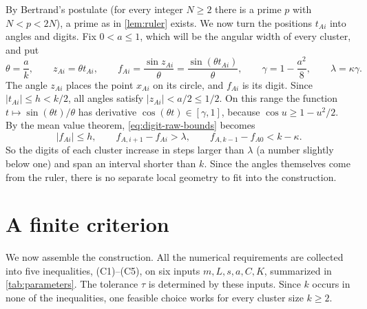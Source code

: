 \documentclass[11pt]{amsart}
\numberwithin{equation}{section}
\theoremstyle{definition}
\theoremstyle{remark}
\newcommand{\cond}[1]{\textup{(C#1)}}
\begin{document}
By Bertrand's postulate (for every integer $N\ge2$ there is a prime $p$
with $N<p<2N$), a prime as in \cref{lem:ruler} exists. We now turn the
positions $t_{Ai}$ into angles and digits. Fix $0<a\le1$, which will be
the angular width of every cluster, and put
\begin{equation}\label{eq:sine-digits}
 \theta=\frac ak,\qquad
 z_{Ai}=\theta t_{Ai},\qquad
 f_{Ai}=\frac{\sin z_{Ai}}{\theta}=\frac{\sin(\theta t_{Ai})}{\theta},\qquad
 \gamma=1-\frac{a^2}{8},\qquad \lambda=\kappa\gamma.
\end{equation}
The angle $z_{Ai}$ places the point $x_{Ai}$ on its circle, and $f_{Ai}$ is
its digit. Since $|t_{Ai}|\le h<k/2$, all angles satisfy
$|z_{Ai}|<a/2\le1/2$. On this range the function $t\mapsto\sin(\theta
t)/\theta$ has derivative $\cos(\theta t)\in[\gamma,1]$, because $\cos
u\ge1-u^2/2$. By the mean value theorem, \eqref{eq:digit-raw-bounds}
becomes
\begin{equation}\label{eq:digit-bounds}
 |f_{Ai}|\le h,\qquad
 f_{A,i+1}-f_{Ai}>\lambda,\qquad
 f_{A,k-1}-f_{A0}<k-\kappa.
\end{equation}
So the digits of each cluster increase in steps larger than $\lambda$ (a
number slightly below one) and span an interval shorter than $k$. Since
the angles themselves come from the ruler, there is no separate local
geometry to fit into the construction.

\section{A finite criterion}\label{sec:criterion}

We now assemble the construction. All the numerical requirements are
collected into five inequalities, \cond1--\cond5, on six inputs
$m,L,s,a,C,K$, summarized in \cref{tab:parameters}. The tolerance
$\tau$ is determined by these inputs. Since $k$ occurs in none of the
inequalities, one feasible choice works for every cluster size $k\ge2$.
\end{document}
